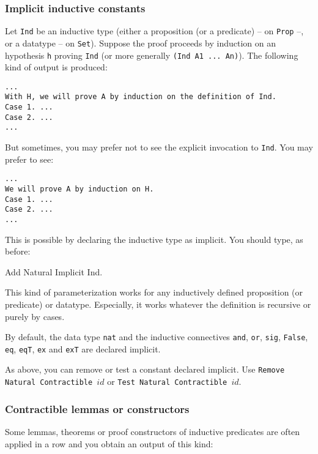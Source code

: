 \subsubsection*{Implicit inductive constants}

Let \verb=Ind= be an inductive type (either a proposition (or a
predicate) -- on \verb=Prop= --, or a datatype -- on \verb=Set=).
Suppose the proof proceeds by induction on an hypothesis \verb=h=
proving \verb=Ind= (or more generally \verb=(Ind A1 ... An)=). The
following kind of output is produced:

\begin{verbatim}
...
With H, we will prove A by induction on the definition of Ind.
Case 1. ...
Case 2. ...
...
\end{verbatim}

But sometimes, you may prefer not to see the explicit invocation to
\verb=Ind=. You may prefer to see:

\begin{verbatim}
...
We will prove A by induction on H.
Case 1. ...
Case 2. ...
...
\end{verbatim}

This is possible by declaring the inductive type as implicit. You should
type, as before:

\begin{coq_example*}
Add Natural Implicit Ind.
\end{coq_example*}

This kind of parameterization works for any inductively defined
proposition (or predicate) or datatype. Especially, it works whatever
the definition is recursive or purely by cases.

By default, the data type \verb=nat= and the inductive connectives
\verb=and=, \verb=or=, \verb=sig=, \verb=False=, \verb=eq=,
\verb=eqT=, \verb=ex= and \verb=exT= are declared implicit.

As above, you can remove or test a constant declared implicit.  Use
{\tt Remove Natural Contractible $id$} or {\tt Test Natural
Contractible $id$}.


\subsubsection*{Contractible lemmas or constructors}

Some lemmas, theorems or proof constructors of inductive predicates are
often applied in a row and you obtain an output of this kind:

